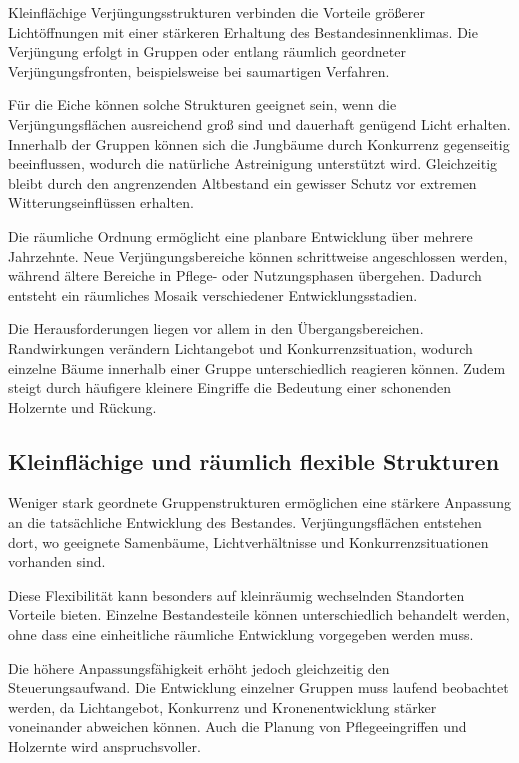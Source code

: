 \documentclass[twocolumn, bibliography=totoc, abstract=true]{scrartcl}
\begin{document}
Kleinflächige Verjüngungsstrukturen verbinden die Vorteile größerer Lichtöffnungen mit einer stärkeren Erhaltung des Bestandesinnenklimas. Die Verjüngung erfolgt in Gruppen oder entlang räumlich geordneter Verjüngungsfronten, beispielsweise bei saumartigen Verfahren.

Für die Eiche können solche Strukturen geeignet sein, wenn die Verjüngungsflächen ausreichend groß sind und dauerhaft genügend Licht erhalten. Innerhalb der Gruppen können sich die Jungbäume durch Konkurrenz gegenseitig beeinflussen, wodurch die natürliche Astreinigung unterstützt wird. Gleichzeitig bleibt durch den angrenzenden Altbestand ein gewisser Schutz vor extremen Witterungseinflüssen erhalten.

Die räumliche Ordnung ermöglicht eine planbare Entwicklung über mehrere Jahrzehnte. Neue Verjüngungsbereiche können schrittweise angeschlossen werden, während ältere Bereiche in Pflege- oder Nutzungsphasen übergehen. Dadurch entsteht ein räumliches Mosaik verschiedener Entwicklungsstadien.

Die Herausforderungen liegen vor allem in den Übergangsbereichen. Randwirkungen verändern Lichtangebot und Konkurrenzsituation, wodurch einzelne Bäume innerhalb einer Gruppe unterschiedlich reagieren können. Zudem steigt durch häufigere kleinere Eingriffe die Bedeutung einer schonenden Holzernte und Rückung.

\subsection{Kleinflächige und räumlich flexible Strukturen}

Weniger stark geordnete Gruppenstrukturen ermöglichen eine stärkere Anpassung an die tatsächliche Entwicklung des Bestandes. Verjüngungsflächen entstehen dort, wo geeignete Samenbäume, Lichtverhältnisse und Konkurrenzsituationen vorhanden sind.

Diese Flexibilität kann besonders auf kleinräumig wechselnden Standorten Vorteile bieten. Einzelne Bestandesteile können unterschiedlich behandelt werden, ohne dass eine einheitliche räumliche Entwicklung vorgegeben werden muss.

Die höhere Anpassungsfähigkeit erhöht jedoch gleichzeitig den Steuerungsaufwand. Die Entwicklung einzelner Gruppen muss laufend beobachtet werden, da Lichtangebot, Konkurrenz und Kronenentwicklung stärker voneinander abweichen können. Auch die Planung von Pflegeeingriffen und Holzernte wird anspruchsvoller.
\end{document}
